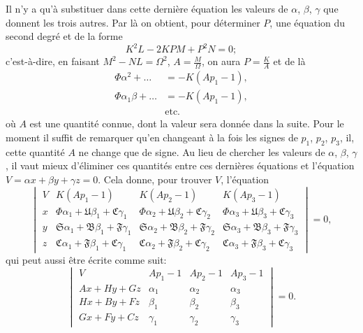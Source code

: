 \documentclass[12pt,a4paper]{article}
\theoremstyle{definition}
\begin{document}
Il n'y a qu'\`{a} substituer dans cette derni\`{e}re \'{e}quation les valeurs de $\alpha$, $\beta$, $\gamma$ que donnent les trois autres. Par l\`{a} on obtient, pour d\'{e}terminer $P$, une \'{e}quation du second degr\'{e} et de la forme
\begin{equation}\tag{13}
K^2 L - 2KP M + P^2 N = 0;
\end{equation}
c'est-\`{a}-dire, en faisant $M^2 - NL = \Omega^2$, $A = \frac{M}{\Omega}$, on aura $P = \frac{K}{A}$ et de l\`{a}
\begin{align}
\tag{14} \Phi \alpha^2 + \ldots &= -K(Ap_1 - 1), \\
\Phi \alpha_1 \beta + \ldots &= -K(Ap_1 - 1), \\
&\text{etc.}
\end{align}
o\`{u} $A$ est une quantit\'{e} connue, dont la valeur sera donn\'{e}e dans la suite. Pour le moment il suffit de remarquer qu'en changeant \`{a} la fois les signes de $p_1$, $p_2$, $p_3$, il, cette quantit\'{e} $A$ ne change que de signe. Au lieu de chercher les valeurs de $\alpha$, $\beta$, $\gamma$, il vaut mieux d'\'{e}liminer ces quantit\'{e}s entre ces derni\`{e}res \'{e}quations et l'\'{e}quation $V = \alpha x + \beta y + \gamma z = 0$. Cela donne, pour trouver $V$, l'\'{e}quation
\begin{equation}\tag{15}
\begin{vmatrix}
V & K(Ap_1 - 1) & K(Ap_2 - 1) & K(Ap_3 - 1) \\
x & \Phi \alpha_1 + \mathfrak{U}\beta_1 + \mathfrak{C}\gamma_1 & \Phi \alpha_2 + \mathfrak{U}\beta_2 + \mathfrak{C}\gamma_2 & \Phi \alpha_3 + \mathfrak{U}\beta_3 + \mathfrak{C}\gamma_3 \\
y & \mathfrak{S}\alpha_1 + \mathfrak{B}\beta_1 + \mathfrak{F}\gamma_1 & \mathfrak{S}\alpha_2 + \mathfrak{B}\beta_2 + \mathfrak{F}\gamma_2 & \mathfrak{S}\alpha_3 + \mathfrak{B}\beta_3 + \mathfrak{F}\gamma_3 \\
z & \mathfrak{C}\alpha_1 + \mathfrak{F}\beta_1 + \mathfrak{C}\gamma_1 & \mathfrak{C}\alpha_2 + \mathfrak{F}\beta_2 + \mathfrak{C}\gamma_2 & \mathfrak{C}\alpha_3 + \mathfrak{F}\beta_3 + \mathfrak{C}\gamma_3
\end{vmatrix} = 0,
\end{equation}
qui peut aussi \^{e}tre \'{e}crite comme suit:
\begin{equation}\tag{16}
\begin{vmatrix}
V & Ap_1 - 1 & Ap_2 - 1 & Ap_3 - 1 \\
Ax + Hy + Gz & \alpha_1 & \alpha_2 & \alpha_3 \\
Hx + By + Fz & \beta_1 & \beta_2 & \beta_3 \\
Gx + Fy + Cz & \gamma_1 & \gamma_2 & \gamma_3
\end{vmatrix} = 0.
\end{equation}
\end{document}
